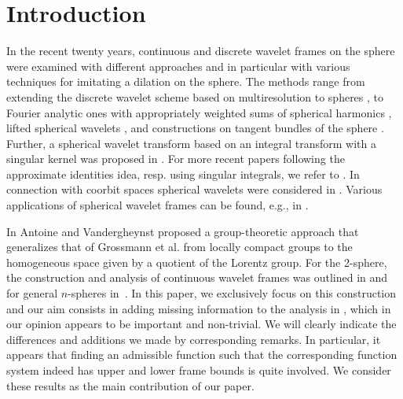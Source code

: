 \documentclass[a4paper,11pt,DIV=11,%
abstract=on%
]{scrartcl}
\newcommand{\red}[1]{#1}
\newcommand{\blue}[1]{#1}
\begin{document}
\section{Introduction} \label{sec:intro}
In the recent twenty years, continuous and discrete  wavelet frames on the sphere were examined
with different approaches and in particular with various techniques for imitating a dilation on the sphere.
The methods range from extending  the discrete wavelet scheme based on multiresolution to spheres \cite{DDSW1995,Go1999}, to 
Fourier analytic ones with appropriately weighted sums of spherical harmonics 
\cite{FSG1997,PST1996,PT1995,MNPW2000}, lifted spherical wavelets \cite{Sweldens1996},
and constructions on tangent bundles of the sphere 
\cite{DM1996}. 
Further, a spherical wavelet transform based on an integral transform 
with a singular kernel was proposed
in \cite{holschneider1996continuous}. 
For more recent papers following the approximate identities idea, resp. using singular integrals,
we refer to \cite{Bernstein2009,BE2010,Nowak2015}. 
In connection with coorbit spaces spherical wavelets were considered in
\cite{DST2004}.
Various applications of spherical wavelet frames can be found, 
e.g., in \cite{FW1997,NW1996,SBHBKP2005}.

\red{In \cite{AV99} Antoine and  Vandergheynst  \blue{proposed} a
  group-theoretic approach} that generalizes  that of
Grossmann et al. \cite{GMP1985,GMP1986} from locally compact groups to the homogeneous space 
given by a quotient of the Lorentz group. 
For the 2-sphere, the construction and analysis of continuous wavelet frames was outlined in \cite{AV99} 
and for general $n$-spheres in~\cite{antoine1998wavelets}.
\red{In this paper, we exclusively focus on this construction and  
our aim} consists in \blue{adding missing information
to the analysis in \cite{AV99}, which in our opinion appears to be important and non-trivial}.
We will clearly indicate the differences and additions we made by corresponding remarks.
In particular, it appears that finding an admissible function such that the
corresponding function system \blue{indeed has upper} and lower frame \red{bounds}
is quite involved. We consider these results as the main contribution of our paper.
\end{document}
